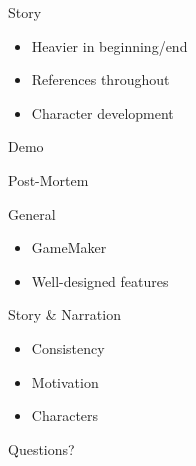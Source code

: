 \documentclass{../teamepsilon}
\begin{document}
\begin{frame}{Story}
    \begin{itemize}
        \item Heavier in beginning/end
        \item References throughout
        \item Character development
    \end{itemize}
\end{frame}


\begin{frame}[standout]
    \Huge
    Demo
\end{frame}

\begin{frame}[standout]
    \Huge
    Post-Mortem
\end{frame}


\begin{frame}{General}
    \begin{itemize}
        \item GameMaker
        \item Well-designed features
    \end{itemize}
\end{frame}

\begin{frame}{Story \& Narration}
    \begin{itemize}
        \item Consistency
        \item Motivation
        \item Characters
    \end{itemize}
\end{frame}


\begin{frame}[standout]
    \Huge
    Questions?
\end{frame}
\end{document}
